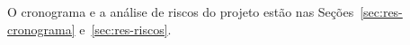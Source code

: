 O cronograma e a análise de riscos do projeto estão nas Seções~\ref{sec:res-cronograma} e~\ref{sec:res-riscos}.






